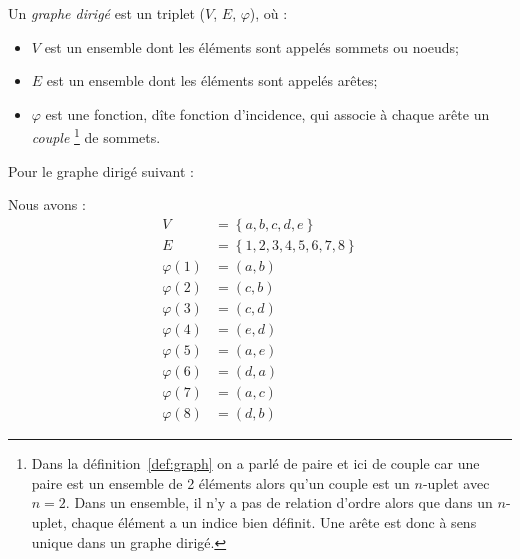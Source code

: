 \begin{mydef}
  Un \emph{graphe dirigé} est un triplet ($V$, $E$, $\varphi$), où :
  \begin{itemize}
    \item $V$ est un ensemble dont les éléments sont appelés sommets ou noeuds;
    \item $E$ est un ensemble dont les éléments sont appelés arêtes;
    \item $\varphi$ est une fonction, dîte fonction d'incidence, qui associe à chaque arête un \emph{couple}
      \footnote{Dans la définition~\ref{def:graph} on a parlé de paire et ici de couple car une paire est
        un ensemble de 2 éléments alors qu'un couple est un $n$-uplet avec $n = 2$.
        Dans un ensemble, il n'y a pas de relation d'ordre alors que dans un $n$-uplet,
        chaque élément a un indice bien définit.
        Une arête est donc à sens unique dans un graphe dirigé.}
      de sommets.
  \end{itemize}
\end{mydef}

\begin{myexem}
Pour le graphe dirigé suivant :
  \begin{center}
  \end{center}
	Nous avons :
    \begin{align*}
      V & = \left\{a,b,c,d,e\right\}\\
      E & = \left\{1,2,3,4,5,6,7,8\right\}\\
      \varphi(1) & = (a,b)\\
      \varphi(2) & = (c,b)\\
      \varphi(3) & = (c,d)\\
      \varphi(4) & = (e,d)\\
      \varphi(5) & = (a,e)\\
      \varphi(6) & = (d,a)\\
      \varphi(7) & = (a,c)\\
      \varphi(8) & = (d,b)
    \end{align*}
\end{myexem}

